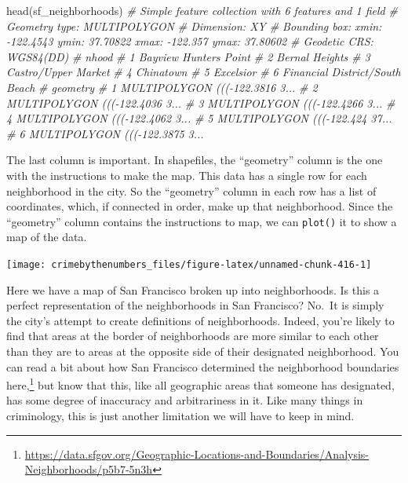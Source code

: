 \documentclass[
]{krantz}
\makeatletter
\newenvironment{Shaded}{\begin{snugshade}}{\end{snugshade}}
\newcommand{\CommentTok}[1]{\textcolor[rgb]{0.37,0.37,0.37}{\textit{#1}}}
\newcommand{\FunctionTok}[1]{\textcolor[rgb]{0,0,0}{#1}}
\newcommand{\NormalTok}[1]{#1}
\newcommand{\SpecialCharTok}[1]{\textcolor[rgb]{0,0,0}{#1}}
\renewcommand{\href}[2]{#2\footnote{\url{#1}}}
\newenvironment{kframe}{%
\medskip{}
\setlength{\fboxsep}{.8em}
 \def\at@end@of@kframe{}%
 \ifinner\ifhmode%
  \def\at@end@of@kframe{\end{minipage}}%
  \begin{minipage}{\columnwidth}%
 \fi\fi%
 \def\FrameCommand##1{\hskip\@totalleftmargin \hskip-\fboxsep
 \colorbox{shadecolor}{##1}\hskip-\fboxsep
     \hskip-\linewidth \hskip-\@totalleftmargin \hskip\columnwidth}%
 \MakeFramed {\advance\hsize-\width
   \@totalleftmargin\z@ \linewidth\hsize
   \@setminipage}}%
 {\par\unskip\endMakeFramed%
 \at@end@of@kframe}
\renewenvironment{Shaded}{\begin{kframe}}{\end{kframe}}
\makeatother
\begin{document}
\begin{Shaded}
\begin{Highlighting}[]
\FunctionTok{head}\NormalTok{(sf\_neighborhoods)}
\CommentTok{\# Simple feature collection with 6 features and 1 field}
\CommentTok{\# Geometry type: MULTIPOLYGON}
\CommentTok{\# Dimension:     XY}
\CommentTok{\# Bounding box:  xmin: {-}122.4543 ymin: 37.70822 xmax: {-}122.357 ymax: 37.80602}
\CommentTok{\# Geodetic CRS:  WGS84(DD)}
\CommentTok{\#                            nhood}
\CommentTok{\# 1          Bayview Hunters Point}
\CommentTok{\# 2                 Bernal Heights}
\CommentTok{\# 3            Castro/Upper Market}
\CommentTok{\# 4                      Chinatown}
\CommentTok{\# 5                      Excelsior}
\CommentTok{\# 6 Financial District/South Beach}
\CommentTok{\#                         geometry}
\CommentTok{\# 1 MULTIPOLYGON ((({-}122.3816 3...}
\CommentTok{\# 2 MULTIPOLYGON ((({-}122.4036 3...}
\CommentTok{\# 3 MULTIPOLYGON ((({-}122.4266 3...}
\CommentTok{\# 4 MULTIPOLYGON ((({-}122.4062 3...}
\CommentTok{\# 5 MULTIPOLYGON ((({-}122.424 37...}
\CommentTok{\# 6 MULTIPOLYGON ((({-}122.3875 3...}
\end{Highlighting}
\end{Shaded}

The last column is important. In shapefiles, the
``geometry'' column is the one with the instructions to make
the map. This data has a single row for each neighborhood in
the city. So the ``geometry'' column in each row has a list
of coordinates, which, if connected in order, make up that
neighborhood. Since the ``geometry'' column contains the
instructions to map, we can \texttt{plot()} it to show a map
of the data.

\begin{Shaded}
\end{Shaded}

\begin{center}\texttt{[image: crimebythenumbers\_files/figure-latex/unnamed-chunk-416-1]} \end{center}

Here we have a map of San Francisco broken up into
neighborhoods. Is this a perfect representation of the
neighborhoods in San Francisco? No.~It is simply the city's
attempt to create definitions of neighborhoods. Indeed,
you're likely to find that areas at the border of
neighborhoods are more similar to each other than they are
to areas at the opposite side of their designated
neighborhood. You can read a bit about how San Francisco
determined the neighborhood boundaries
\href{https://data.sfgov.org/Geographic-Locations-and-Boundaries/Analysis-Neighborhoods/p5b7-5n3h}{here,}
but know that this, like all geographic areas that someone
has designated, has some degree of inaccuracy and
arbitrariness in it. Like many things in criminology, this
is just another limitation we will have to keep in mind.
\end{document}
